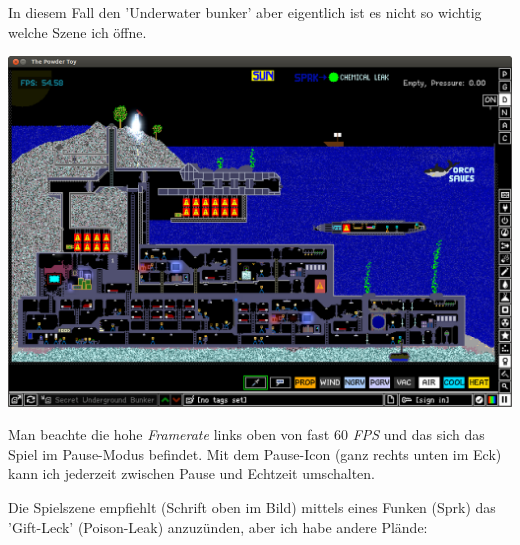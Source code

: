 \documentclass[10pt,a4paper,ngerman,twoside]{article} %
\begin{document}
\begin{multicols}{2}
In diesem Fall den 'Underwater bunker' aber eigentlich ist es nicht so wichtig welche Szene ich öffne.
\begin{center}
\includegraphics[width=\linewidth]{powdertoy/powdertoy-bu1.png}
\end{center}
Man beachte die hohe \textit{Framerate} links oben von fast 60 \textit{FPS} und das sich das Spiel im Pause-Modus befindet. Mit dem Pause-Icon (ganz rechts unten im Eck) kann ich jederzeit zwischen Pause und Echtzeit umschalten.

Die Spielszene empfiehlt (Schrift oben im Bild) mittels eines Funken (Sprk) das 'Gift-Leck' (Poison-Leak) anzuzünden, aber ich habe andere Plände:


\end{multicols}
\end{document}
